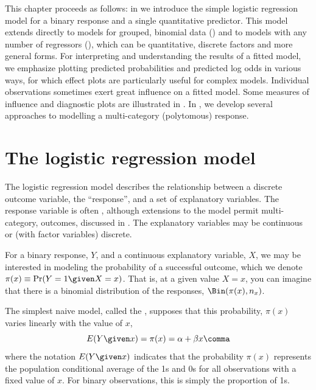 \documentclass[11pt]{book}
\begin{document}
This chapter proceeds as follows: in 
we introduce the simple logistic regression model for a binary response
and a single quantitative predictor.  This model extends directly
to models for grouped, binomial data ()
and to models with any number of regressors (),
which can be quantitative, discrete factors and more general forms.
For interpreting and understanding the results of a fitted model,
we emphasize plotting predicted probabilities and predicted log odds
in various ways, for which effect plots 
are particularly useful for complex models.
Individual observations sometimes exert great influence on a fitted model.
Some measures of influence and diagnostic plots are illustrated in
.
In , we develop several approaches to
modelling a multi-category (polytomous) response.

\section{The logistic regression model}\label{sec:logist-model}

The logistic regression model
describes the relationship between a discrete outcome variable,
the ``response'', and a set of explanatory variables.
The response variable is often , although
extensions to the model permit multi-category,
 outcomes, discussed in
.
The explanatory variables may be continuous or (with factor variables)
discrete.

For a binary response, $Y$, and a continuous explanatory variable, $X$,
we may be interested in modeling the probability of a successful
outcome, which we denote $\pi(x) \equiv \Pr(Y=1 \given X=x)$.
That is, at a given value $X = x$, you can imagine that there is a
binomial distribution of the responses, $\Bin( \pi(x), n_x )$.

The simplest naive model, called the ,
supposes that this probability, $\pi (x)$ varies
linearly with the value of $x$,
\begin{equation}\label{eq:logit0}
E ( Y \given x) = \pi(x) =
\alpha + \beta x \comma
\end{equation}
where the notation $E ( Y \given x)$ indicates that the probability $\pi (x)$
represents the population
conditional average of the 1s and 0s for all observations with a fixed value of $x$.
For binary observations, this is simply the proportion of 1s.
\end{document}
